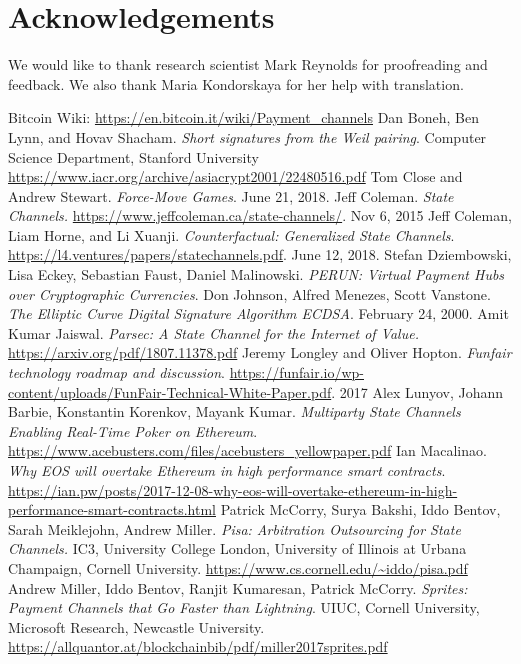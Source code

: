 \documentclass[tikz, 12pt]{article}
\theoremstyle{definition}
\theoremstyle{remark}
\begin{document}
\section*{Acknowledgements}
We would like to thank research scientist Mark Reynolds for proofreading and feedback. We also thank Maria Kondorskaya for her help with translation. 
	\begin{thebibliography}{9}
 Bitcoin Wiki: \url{https://en.bitcoin.it/wiki/Payment_channels}
 Dan Boneh, Ben Lynn, and Hovav Shacham. \emph{Short signatures from the Weil pairing}. Computer Science Department, Stanford University \url{https://www.iacr.org/archive/asiacrypt2001/22480516.pdf}
 Tom Close and Andrew Stewart. \emph{Force-Move Games}. June 21, 2018.
 Jeff Coleman. \emph{State Channels.} \url{https://www.jeffcoleman.ca/state-channels/}. Nov 6, 2015
 Jeff Coleman, Liam Horne, and Li Xuanji. \emph{Counterfactual: Generalized State Channels}. \url{https://l4.ventures/papers/statechannels.pdf}. June 12, 2018.
 Stefan Dziembowski, Lisa Eckey, Sebastian Faust, Daniel Malinowski. \emph{PERUN: Virtual Payment Hubs over Cryptographic Currencies}.
 Don Johnson, Alfred Menezes, Scott Vanstone. \emph{The Elliptic Curve Digital Signature Algorithm ECDSA}. February 24, 2000.
 Amit Kumar Jaiswal. \emph{Parsec: A State Channel for the Internet of Value.} \url{https://arxiv.org/pdf/1807.11378.pdf}
 Jeremy Longley and Oliver Hopton. \emph{Funfair technology roadmap and discussion}. \url{https://funfair.io/wp-content/uploads/FunFair-Technical-White-Paper.pdf}. 2017
 Alex Lunyov, Johann Barbie, Konstantin Korenkov, Mayank Kumar. \emph{Multiparty State Channels Enabling Real-Time Poker on Ethereum}. \url{https://www.acebusters.com/files/acebusters_yellowpaper.pdf}
 Ian Macalinao. \emph{Why EOS will overtake Ethereum in high performance smart contracts}. \url{https://ian.pw/posts/2017-12-08-why-eos-will-overtake-ethereum-in-high-performance-smart-contracts.html}
 Patrick McCorry, Surya Bakshi, Iddo Bentov, Sarah Meiklejohn, Andrew Miller. \emph{Pisa: Arbitration Outsourcing for State Channels.} IC3, University College London, University of Illinois at Urbana Champaign, Cornell University. \url{https://www.cs.cornell.edu/~iddo/pisa.pdf}
 Andrew Miller, Iddo Bentov, Ranjit Kumaresan, Patrick McCorry. \emph{Sprites: Payment Channels that Go Faster than Lightning}. UIUC, Cornell University, Microsoft Research, Newcastle University. \url{https://allquantor.at/blockchainbib/pdf/miller2017sprites.pdf}

\end{thebibliography}
\end{document}
